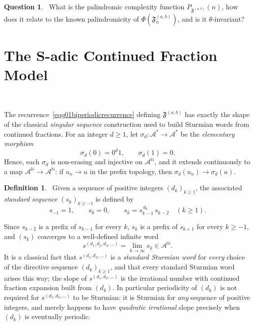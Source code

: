 \documentclass[12pt]{amsart}
\theoremstyle{plain}
\theoremstyle{definition}
\newtheorem{definition}{Definition}
\newtheorem{question}{Question}
\theoremstyle{remark}
\newcommand{\N}{\mathbb{N}}
\newcommand{\AlphA}{\mathcal{A}}
\newcommand{\FD}{\mathfrak{F}}
\begin{document}
\begin{question}~\label{q04palindrome}
What is the palindromic complexity function $P_{\FD^{(a,b)}}(n)$, how does
it relate to the known palindromicity of $\Phi(\FD^{(a,b)}_n)$, and is it
$\theta$-invariant?
\end{question}

\section{The S-adic Continued Fraction Model}~\label{sec01sadic}

The recurrence~\eqref{eqq01biperiodicrecurrence} defining $\FD^{(a,b)}$ has
exactly the shape of the classical \emph{singular sequence}
construction used to build Sturmian words from continued fractions. 
For an integer $d\ge1$, let $\sigma_d\colon\AlphA ^{*}\to\AlphA ^{*}$ be the
\emph{elementary morphism}
\[
  \sigma_d(0) = 0^d1, \qquad \sigma_d(1) = 0.
\]
Hence, each $\sigma_d$ is non-erasing and injective on $\AlphA ^{\N}$, and it extends continuously to a map $\AlphA ^{\N}\to\AlphA ^{\N}$: if $u_n\to u$
in the prefix topology, then $\sigma_d(u_n)\to\sigma_d(u)$.

\begin{definition}~\label{def01standardsequence}
Given a sequence of positive integers $(d_k)_{k\ge1}$, the associated \emph{standard sequence} $(s_k)_{k\ge-1}$ is
defined by
\[
  s_{-1} = 1, \qquad s_0 = 0, \qquad
  s_k = s_{k-1}^{\,d_k}\,s_{k-2} \quad (k\ge1).
\]
\end{definition}

Since $s_{k-2}$ is a prefix of $s_{k-1}$ for every $k$, $s_k$ is a
prefix of $s_{k+1}$ for every $k\ge-1$, and $(s_k)$ converges to a
well-defined infinite word
\[
  s^{(d_1,d_2,d_3,\ldots)} = \lim_{k\to\infty} s_k \in \AlphA ^{\N}.
\]
It is a classical fact  that $s^{(d_1,d_2,\ldots)}$ is a \emph{standard Sturmian word} for
\emph{every} choice of the directive sequence $(d_k)_{k\ge1}$, and that
every standard Sturmian word arises this way; the slope of
$s^{(d_1,d_2,\ldots)}$ is the irrational number with continued fraction
expansion built from $(d_k)$. In particular periodicity of $(d_k)$ is
not required for $s^{(d_1,d_2,\ldots)}$ to be Sturmian: it is Sturmian
for \emph{any} sequence of positive integers, and merely happens to have
\emph{quadratic irrational} slope precisely when $(d_k)$ is eventually
periodic.
\end{document}
